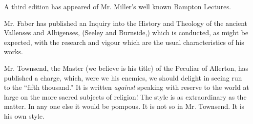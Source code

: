A third edition has appeared of Mr. Miller's well
known Bampton Lectures.

Mr. Faber has published an Inquiry into the History
and Theology of the ancient Vallenses and Albigenses, (Seeley and
Burnside,) which is conducted, as might be expected, with the research
and vigour which are the usual characteristics of his works.

Mr. Townsend, the Master (we believe is his title)
of the Peculiar of Allerton, has published a charge, which, were we his
enemies, we should delight in seeing run to the ``fifth thousand.'' It is
written \emph{against} speaking with reserve to the world at large on
the more sacred subjects of religion! The style is as extraordinary as
the matter. In any one else it would be pompous. It is not so in Mr.
Townsend. It is his own style.

